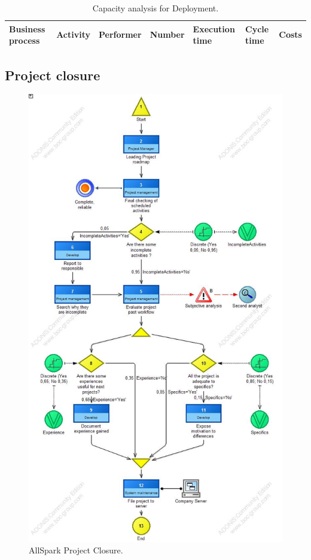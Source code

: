 \begin{landscape}
\begin{table}
\centering
{\tiny
\begin{tabular}{|l|l|l|l|l|l|l|}
Business process&Activity&Performer&Number&Execution time&Cycle time&Costs\\
\hline

\end{tabular}
}
\caption{Capacity analysis for Deployment.}
\end{table}
\end{landscape}
%

%

\subsection{Project closure}

\begin{figure}[ht!]
\begin{centering}
\includegraphics[scale=0.50]{assign2/adonis/imgs/closure.jpg}
\caption{AllSpark Project Closure.}
\label{2img:closure}
\end{centering}
\end{figure}


